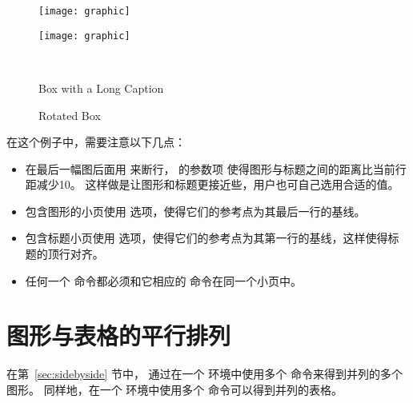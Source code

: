 \begin{figure}
	\centering
	\begin{minipage}[b]{.4\linewidth}
		\centering
		\texttt{[image: graphic]}
	\end{minipage}%
	\hspace{1cm}%
	\begin{minipage}[b]{.4\linewidth}
		\centering
		\texttt{[image: graphic]}
	\end{minipage}\\[-10pt]
	\begin{minipage}[t]{.4\linewidth}
		\caption{Box with a Long Caption}\label{fig:mininonrot:a}
	\end{minipage}%
	\hspace{1cm}%
	\begin{minipage}[t]{.4\linewidth}
		\caption{Rotated Box}\label{fig:minirot:a}
	\end{minipage}%
\end{figure}

在这个例子中，需要注意以下几点：
\begin{itemize}
	\item 在最后一幅图后面用 \cmd{\cmd{}} 来断行，
	\cmd{\cmd{}}的参数项 \opt{[-10pt]} 使得图形与标题之间的距离比当前行距减少10\pt 。
	这样做是让图形和标题更接近些，用户也可自己选用合适的值。
	\item 包含图形的小页使用 \opt{[b]} 选项，使得它们的参考点为其最后一行的基线。
	\item 包含标题小页使用 \opt{[t]} 选项，使得它们的参考点为其第一行的基线，这样使得标题的顶行对齐。
	\item 任何一个  命令都必须和它相应的  命令在同一个小页中。
\end{itemize}


\section{图形与表格的平行排列}\label{sec:figuretable}

在第~\ref{sec:sidebyside} 节中，
通过在一个  环境中使用多个  命令来得到并列的多个图形。
同样地，在一个  环境中使用多个  命令可以得到并列的表格。

